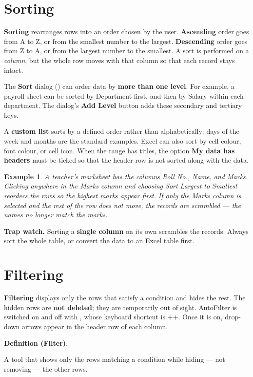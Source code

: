 \documentclass[11pt]{article}
\newtheorem{example}{Example}[section]
\newenvironment{definitionbox}[1]{%
  \par\noindent\textbf{Definition (#1).}\ \itshape
}{\par\vspace{0.3em}}
\begin{document}
\section{Sorting}
\textbf{Sorting} rearranges rows into an order chosen by the user. \textbf{Ascending}
order goes from A to Z, or from the smallest number to the largest.
\textbf{Descending} order goes from Z to A, or from the largest number to the
smallest. A sort is performed on a \emph{column}, but the whole row moves with
that column so that each record stays intact.

The \textbf{Sort} dialog () can order data by \textbf{more than
one level}. For example, a payroll sheet can be sorted by Department first, and
then by Salary within each department. The dialog's \textbf{Add Level} button
adds these secondary and tertiary keys.

A \textbf{custom list} sorts by a defined order rather than alphabetically: days
of the week and months are the standard examples. Excel can also sort by cell
colour, font colour, or cell icon. When the range has titles, the option
\textbf{My data has headers} must be ticked so that the header row is not sorted
along with the data.

\begin{example}
A teacher's marksheet has the columns Roll No., Name, and Marks. Clicking
anywhere in the Marks column and choosing Sort Largest to Smallest reorders the
rows so the highest marks appear first. If only the Marks column is selected and
the rest of the row does not move, the records are scrambled --- the names no
longer match the marks.
\end{example}

\textbf{Trap watch.} Sorting a \textbf{single column} on its own scrambles the
records. Always sort the whole table, or convert the data to an Excel table
first.

\section{Filtering}
\textbf{Filtering} displays only the rows that satisfy a condition and hides the
rest. The hidden rows are \textbf{not deleted}; they are temporarily out of
sight. AutoFilter is switched on and off with , whose
keyboard shortcut is $+$$+$. Once it is on,
drop-down arrows appear in the header row of each column.

\begin{definitionbox}{Filter}
A tool that shows only the rows matching a condition while hiding --- not
removing --- the other rows.
\end{definitionbox}
\end{document}
